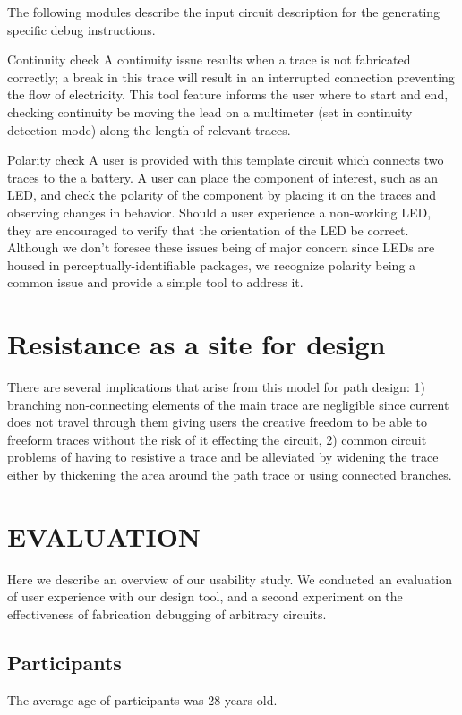 \documentclass{sigchi}
\begin{document}
        The following modules describe the input circuit description for the generating specific debug instructions. 

        Continuity check
        A continuity issue results when a trace is not fabricated correctly; a break in this trace will result in an interrupted connection preventing the flow of electricity. This tool feature informs the user where to start and end, checking continuity be moving the lead on a multimeter (set in continuity detection mode) along the length of relevant traces. 
        
        Polarity check
        A user is provided with this template circuit which connects two traces to the a battery. A user can place the component of interest, such as an LED, and check the polarity of the component by placing it on the traces and observing changes in behavior. Should a user experience a non-working LED, they are encouraged to verify that the orientation of the LED be correct. Although we don't foresee these issues being of major concern since LEDs are housed in perceptually-identifiable packages, we recognize polarity being a common issue and provide a simple tool to address it. 

        
    \section{Resistance as a site for design}
        There are several implications that arise from this model for path design: 1) branching non-connecting elements of the main trace are negligible since current does not travel through them giving users the creative freedom to be able to freeform traces without the risk of it effecting the circuit, 2) common circuit problems of having to resistive a trace and be alleviated by widening the trace either by thickening the area around the path trace or using connected branches. 
        
\section{EVALUATION}
    Here we describe an overview of our usability study. We conducted an evaluation of user experience with our design tool, and a second experiment on the effectiveness of fabrication debugging of arbitrary circuits. 

\subsection{Participants}
    The average age of participants was 28 years old. 
\end{document}

